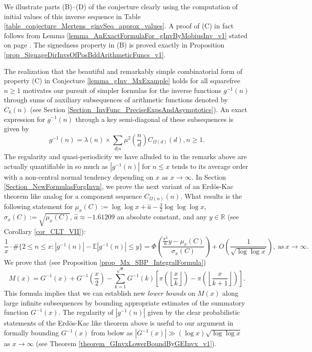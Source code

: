 \documentclass[11pt,reqno,a4letter]{article}
\numberwithin{figure}{section}
\numberwithin{table}{section}
\newcommand{\Floor}[2]{\ensuremath{\left\lfloor \frac{#1}{#2} \right\rfloor}}
\theoremstyle{plain}
\numberwithin{theorem}{section}
\theoremstyle{definition}
\begin{document}
We illustrate parts (B)--(D) of the conjecture clearly using the computation of initial values of 
this inverse sequence in 
Table \ref{table_conjecture_Mertens_ginvSeq_approx_values}. 
A proof of (C) in fact follows from 
Lemma \ref{lemma_AnExactFormulaFor_gInvByMobiusInv_v1} 
stated on page \pageref{lemma_AnExactFormulaFor_gInvByMobiusInv_v1}. 
The signedness property in (B) is proved exactly in 
Proposition \ref{prop_SignageDirInvsOfPosBddArithmeticFuncs_v1}. 

The realization that the beautiful and remarkably simple combinatorial form of property (C) 
in Conjecture \ref{lemma_gInv_MxExample} holds for all squarefree $n \geq 1$ 
motivates our pursuit of simpler formulas for the inverse functions $g^{-1}(n)$ 
through sums of auxiliary subsequences of arithmetic functions denoted by $C_k(n)$  
(see Section \ref{Section_InvFunc_PreciseExpsAndAsymptotics}). 
An exact expression for $g^{-1}(n)$ through a key semi-diagonal of these subsequences 
is given by 
\[
g^{-1}(n) = \lambda(n) \times \sum_{d|n} \mu^2\left(\frac{n}{d}\right) C_{\Omega(d)}(d), n \geq 1. 
\]
The regularity and quasi-periodicity we have alluded to in the remarks above are actually 
quantifiable in so much as $|g^{-1}(n)|$ for $n \leq x$ 
tends to its average order with a non-central normal tendency 
depending on $x$ as $x \rightarrow \infty$. 
In Section \ref{Section_NewFormulasForgInvn}, 
we prove the next variant of an Erd\"os-Kac theorem like analog
for a component sequence $C_{\Omega(n)}(n)$. 
What results is the following statement for 
$\mu_x(C) := \log\log x + \hat{a} - \frac{3}{2}\log\log\log x$, $\sigma_x(C) := \sqrt{\mu_x(C)}$, 
$\hat{a} \approx -1.61209$ an absolute constant, and any $y \in \mathbb{R}$ (see 
Corollary \ref{cor_CLT_VII}): 
\[
\frac{1}{x} \cdot \#\{2 \leq n \leq x: |g^{-1}(n)| - \mathbb{E}|g^{-1}(n)| \leq y\} = 
     \Phi\left(\frac{\frac{\pi^2}{6}y - \mu_x(C)}{\sigma_x(C)}\right) + 
     O\left(\frac{1}{\sqrt{\log\log x}}\right), 
     \mathrm{\ as\ } x \rightarrow \infty. 
\]
We prove that (see Proposition \ref{prop_Mx_SBP_IntegralFormula}) 
\[
M(x) = G^{-1}(x) + G^{-1}\left(\frac{x}{2}\right) - 
     \sum_{k=1}^{\sqrt{x}} G^{-1}(k) \left[ 
     \pi\left(\Floor{x}{k}\right) - \pi\left(\Floor{x}{k+1}\right) 
     \right]. 
\]
This formula 
implies that we can establish new \emph{lower bounds} on $M(x)$ along large infinite subsequences 
by bounding appropriate estimates of the summatory function $G^{-1}(x)$. 
The regularity of $|g^{-1}(n)|$ given by the clear probabilistic statements of the 
Erd\"os-Kac like theorem above is useful to our argument in formally bounding $G^{-1}(x)$ from
below as $|G^{-1}(x)| \gg (\log x) \sqrt{\log\log x}$ as $x \rightarrow \infty$ 
(see Theorem \ref{theorem_GInvxLowerBoundByGEInvx_v1}). 
\end{document}

